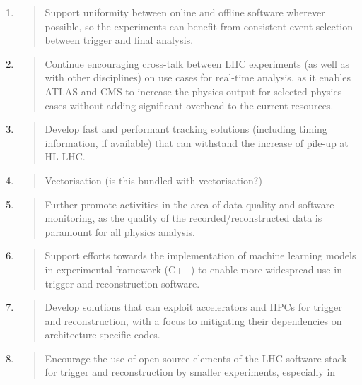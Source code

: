 \documentclass[10pt,a4paper]{article}
\begin{document}
\begin{enumerate}
\def\labelenumi{\arabic{enumi}.}
\item
  \begin{quote}
  Support uniformity between online and offline software wherever
  possible, so the experiments can benefit from consistent event
  selection between trigger and final analysis.
  \end{quote}
\item
  \begin{quote}
  Continue encouraging cross-talk between LHC experiments (as well as
  with other disciplines) on use cases for real-time analysis, as it
  enables ATLAS and CMS to increase the physics output for selected
  physics cases without adding significant overhead to the current
  resources.
  \end{quote}
\item
  \begin{quote}
  Develop fast and performant tracking solutions (including timing
  information, if available) that can withstand the increase of pile-up
  at HL-LHC.
  \end{quote}
\item
  \begin{quote}
  Vectorisation (is this bundled with vectorisation?)
  \end{quote}
\item
  \begin{quote}
  Further promote activities in the area of data quality and software
  monitoring, as the quality of the recorded/reconstructed data is
  paramount for all physics analysis.
  \end{quote}
\item
  \begin{quote}
  Support efforts towards the implementation of machine learning models
  in experimental framework (C++) to enable more widespread use in
  trigger and reconstruction software.
  \end{quote}
\item
  \begin{quote}
  Develop solutions that can exploit accelerators and HPCs for trigger
  and reconstruction, with a focus to mitigating their dependencies on
  architecture-specific codes.
  \end{quote}
\item
  \begin{quote}
  Encourage the use of open-source elements of the LHC software stack
  for trigger and reconstruction by smaller experiments, especially in

\end{quote}
\end{enumerate}
\end{document}

